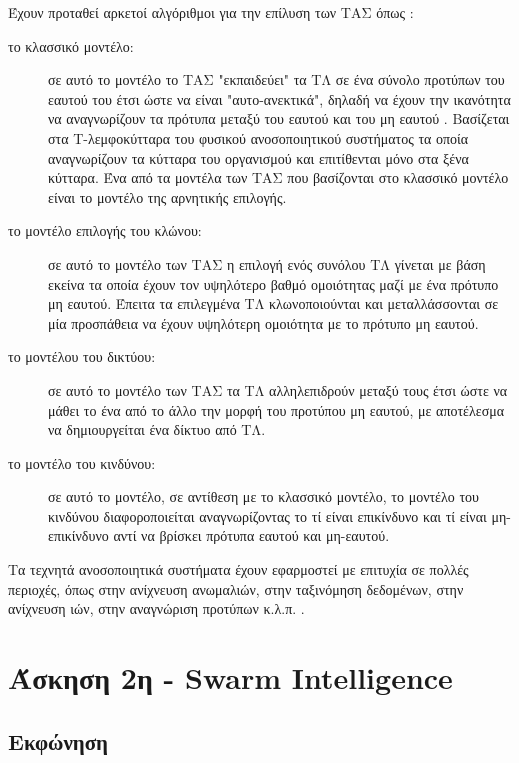 \documentclass{assignment}
\begin{document}
Έχουν προταθεί αρκετοί αλγόριθμοι για την επίλυση των ΤΑΣ όπως \cite{engelbrecht}:
\begin{description}

\item[το κλασσικό μοντέλο:] σε αυτό το μοντέλο το ΤΑΣ "εκπαιδεύει" τα ΤΛ σε ένα σύνολο προτύπων του εαυτού του έτσι ώστε να είναι "αυτο-ανεκτικά", δηλαδή να έχουν την ικανότητα να αναγνωρίζουν τα πρότυπα μεταξύ του εαυτού και του μη εαυτού \cite{engelbrecht}. Βασίζεται στα Τ-λεμφοκύτταρα του φυσικού ανοσοποιητικού συστήματος τα οποία αναγνωρίζουν τα κύτταρα του οργανισμού και επιτίθενται μόνο στα ξένα κύτταρα. Ένα από τα μοντέλα των ΤΑΣ που βασίζονται στο κλασσικό μοντέλο είναι το μοντέλο της αρνητικής επιλογής.

\item[το μοντέλο επιλογής του κλώνου:]  σε αυτό το μοντέλο των ΤΑΣ η επιλογή ενός συνόλου ΤΛ γίνεται με βάση εκείνα τα οποία έχουν τον υψηλότερο βαθμό ομοιότητας μαζί με ένα πρότυπο μη εαυτού. Έπειτα τα επιλεγμένα ΤΛ κλωνοποιούνται και μεταλλάσσονται σε μία προσπάθεια να έχουν υψηλότερη ομοιότητα με το πρότυπο μη εαυτού.

\item[το μοντέλου του δικτύου:] σε αυτό το μοντέλο των ΤΑΣ τα ΤΛ αλληλεπιδρούν μεταξύ τους έτσι ώστε να μάθει το ένα από το άλλο την μορφή του προτύπου μη εαυτού, με αποτέλεσμα να δημιουργείται ένα δίκτυο από ΤΛ.

\item[το μοντέλο του κινδύνου:] σε αυτό το μοντέλο, σε αντίθεση με το κλασσικό μοντέλο, το μοντέλο του κινδύνου διαφοροποιείται αναγνωρίζοντας το τί είναι επικίνδυνο και τί είναι μη-επικίνδυνο αντί να βρίσκει πρότυπα εαυτού και μη-εαυτού.

\end{description}

Τα τεχνητά ανοσοποιητικά συστήματα έχουν εφαρμοστεί με επιτυχία σε πολλές περιοχές, όπως στην ανίχνευση ανωμαλιών, στην ταξινόμηση δεδομένων, στην ανίχνευση ιών, στην αναγνώριση προτύπων κ.λ.π. \cite{wiki:artificial_immune_system, engelbrecht, karakasis_thesis}.

\section{Άσκηση 2η - Swarm Intelligence}
\subsection{Εκφώνηση}
\end{document}
